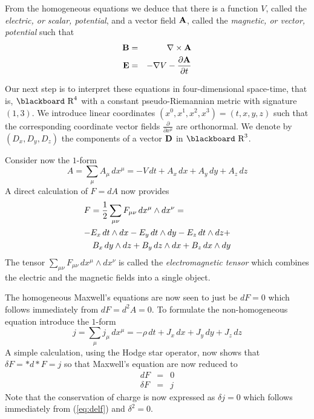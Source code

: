 \documentclass[12pt,titlepage]{article}
\def\bbf#1{\hbox{\blackboard #1}}
\def\lR{\bbf R}
\def\ppv#1#2{\frac{\partial}{\partial #1^#2}}
\begin{document}
From the homogeneous equations we deduce that there is a function
\(V\), called the {\em electric, or scalar, potential\/},
%
and a vector field \({\bf A}\), called the {\em magnetic, or vector,
 potential\/}
%
%
such that 
\begin{eqnarray*} 
{\bf B} &=& {\bf \nabla}\times {\bf A} \\ 
{\bf E} &=& -{\bf \nabla}V - \frac{\partial {\bf A}}{\partial t}
\end{eqnarray*}%

Our next step is to interpret these equations in four-dimensional 
space-time, that is, \(\lR^4\) with a constant pseudo-Riemannian metric 
with signature \((1,3)\). We introduce  linear coordinates 
\((x^0,x^1,x^2,x^3)=(t, x, y,z)\) such that the corresponding coordinate 
vector fields \(\ppv{x}{\mu}\) are orthonormal. 
We denote by  \((D_x,D_y,D_z)\) the components of
 a vector \({\bf D}\)
in \(\lR^3\).

Consider now the \(1\)-form 
\[%
A = \sum_\mu A_\mu\, dx^\mu=-V\, dt + A_x\, dx + A_y\, dy + A_z\, dz 
\]%
A direct calculation of \(F=dA\)
 now provides
\begin{eqnarray}\label{eq:fda}\nonumber
\lefteqn{F= \frac{1}{2}\sum_{\mu\nu}F_{\mu\nu}\,dx^\mu\wedge dx^\nu =}
 \\ \nonumber
\lefteqn{-E_x\,dt\wedge dx -E_y\, dt\wedge dy -E_z\, dt\wedge dz +}\\ 
& & B_x\, dy\wedge dz +B_y\, dz\wedge dx + B_z\, dx\wedge dy
\end{eqnarray}%
The tensor \(\sum_{\mu\nu}F_{\mu\nu}\,dx^\mu\wedge dx^\nu\) is called 
the 
{\em electromagnetic tensor\/}
%
which combines the electric and the magnetic fields into a single
object.

The homogeneous Maxwell's equations are now seen to just be \(dF=0\) which 
follows immediately from \(dF = d^2A =
0\). To formulate the non-homogeneous equation introduce the \(1\)-form 
\begin{equation}\label{eq:jform}%
j = \sum_\mu j_\mu\, dx^\mu= -\rho\, dt + J_x\, dx + J_y\, dy + J_z\, dz 
\end{equation}%
A simple calculation, using the Hodge star operator, now shows that 
\(\delta F = *d*F = j\) so that
Maxwell's equation are now reduced to 
\begin{eqnarray}\label{eq:df}%
dF &=& 0 \\ \label{eq:delf}
\delta F &=& j
\end{eqnarray}%
Note that the conservation of charge is now expressed as \(\delta j =0\) 
which follows immediately from (\ref{eq:delf}) and \(\delta^2=0\).
\end{document}
